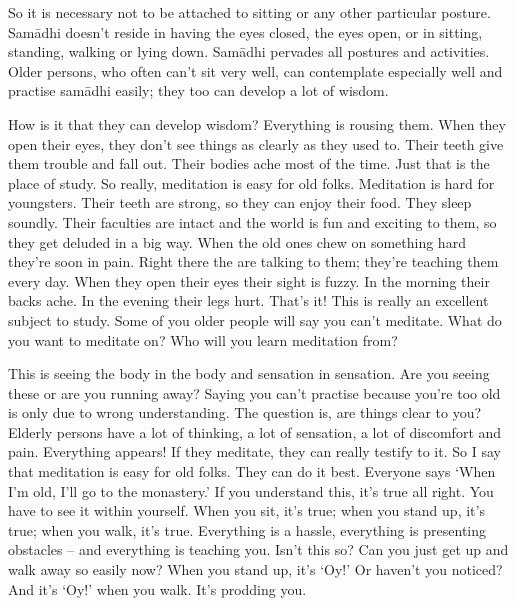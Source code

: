 So it is necessary not to be attached to sitting or any other particular posture. Sam\=adhi doesn't reside in having the eyes closed, the eyes open, or in sitting, standing, walking or lying down. Sam\=adhi pervades all postures and activities. Older persons, who often can't sit very well, can contemplate especially well and practise sam\=adhi easily; they too can develop a lot of wisdom. 

How is it that they can develop wisdom? Everything is rousing them. When they open their eyes, they don't see things as clearly as they used to. Their teeth give them trouble and fall out. Their bodies ache most of the time. Just that is the place of study. So really, meditation is easy for old folks. Meditation is hard for youngsters. Their teeth are strong, so they can enjoy their food. They sleep soundly. Their faculties are intact and the world is fun and exciting to them, so they get deluded in a big way. When the old ones chew on something hard they're soon in pain. Right there the  are talking to them; they're teaching them every day. When they open their eyes their sight is fuzzy. In the morning their backs ache. In the evening their legs hurt. That's it! This is really an excellent subject to study. Some of you older people will say you can't meditate. What do you want to meditate on? Who will you learn meditation from? 

This is seeing the body in the body and sensation in sensation. Are you seeing these or are you running away? Saying you can't practise because you're too old is only due to wrong understanding. The question is, are things clear to you? Elderly persons have a lot of thinking, a lot of sensation, a lot of discomfort and pain. Everything appears! If they meditate, they can really testify to it. So I say that meditation is easy for old folks. They can do it best. Everyone says `When I'm old, I'll go to the monastery.' If you understand this, it's true all right. You have to see it within yourself. When you sit, it's true; when you stand up, it's true; when you walk, it's true. Everything is a hassle, everything is presenting obstacles -- and everything is teaching you. Isn't this so? Can you just get up and walk away so easily now? When you stand up, it's `Oy!' Or haven't you noticed? And it's `Oy!' when you walk. It's prodding you. 

